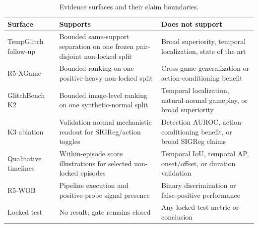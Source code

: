 \begin{table}[t]
\caption{Evidence surfaces and their claim boundaries.}
\label{tab:limitations-claim-boundary}
\centering
\small
\begin{tabularx}{\textwidth}{@{}lXX@{}}
\toprule
Surface & Supports & Does not support \\
\midrule
TempGlitch follow-up & Bounded same-support separation on one frozen pair-disjoint non-locked split & Broad superiority, temporal localization, state of the art \\
R5-XGame & Bounded ranking on one positive-heavy non-locked split & Cross-game generalization or action-conditioning benefit \\
GlitchBench K2 & Bounded image-level ranking on one synthetic-normal split & Temporal localization, natural-normal gameplay, or broad superiority \\
K3 ablation & Validation-normal mechanistic readout for SIGReg/action toggles & Detection AUROC, action-conditioning benefit, or broad SIGReg claims \\
Qualitative timelines & Within-episode score illustrations for selected non-locked episodes & Temporal IoU, temporal AP, onset/offset, or duration validation \\
R5-WOB & Pipeline execution and positive-probe signal presence & Binary discrimination or false-positive performance \\
Locked test & No result; gate remains closed & Any locked-test metric or conclusion \\
\bottomrule
\end{tabularx}
\end{table}
